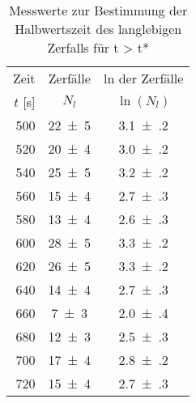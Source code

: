 \begin{table}[!h]
	\centering
	\begin{tabular}{|r|c|c|}
		\hline
		Zeit & Zerfälle & ln der Zerfälle\\
		$t$ [\si{\second}] & $N_{l}$ & $\ln(N_{l})$\\
\hline\hline
		\num{500} & \num{22(5)} & \num{3.1(2)}\\
		\num{520} & \num{20(4)} & \num{3.0(2)}\\
		\num{540} & \num{25(5)} & \num{3.2(2)}\\
		\num{560} & \num{15(4)} & \num{2.7(3)}\\
		\num{580} & \num{13(4)} & \num{2.6(3)}\\
		\num{600} & \num{28(5)} & \num{3.3(2)}\\
		\num{620} & \num{26(5)} & \num{3.3(2)}\\
		\num{640} & \num{14(4)} & \num{2.7(3)}\\
		\num{660} & \num{7(3)} & \num{2.0(4)}\\
		\num{680} & \num{12(3)} & \num{2.5(3)}\\
		\num{700} & \num{17(4)} & \num{2.8(2)}\\
		\num{720} & \num{15(4)} & \num{2.7(3)}\\
		\hline
	\end{tabular}
	\caption{Messwerte zur Bestimmung der Halbwertszeit des langlebigen Zerfalls für t > t* \label{tab:Auswertung_Messwerte_Rhodium_lang}}
\end{table}
